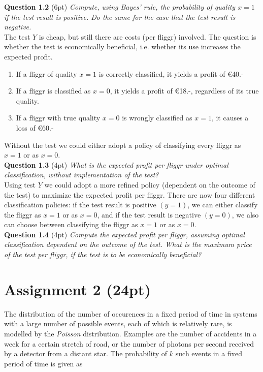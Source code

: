 \documentclass[a4paper]{article}
\begin{document}
\textbf{Question 1.2} (6pt)  \textit{Compute, using Bayes’ rule, the probability of quality $x = 1$ if the test result is positive. Do the same for the case that the test result is negative.}\\


The test $Y$ is cheap, but still there are costs (per fliggr) involved. The question is whether the test is economically beneficial, i.e. whether its use increases the expected profit.

\begin{enumerate}
	\item If a fliggr of quality $x = 1$ is correctly classified, it yields a profit of \euro{}40.-
	\item If a fliggr is classified as $x = 0$, it yields a profit of \euro{}18.-, regardless of its true quality.
	\item If a fliggr with true quality $x = 0$ is wrongly classified as $x = 1$, it causes a loss of \euro{}60.-
\end{enumerate}

Without the test we could either adopt a policy of classifying every fliggr as $x = 1$ or as $x = 0$.\\

\textbf{Question 1.3} (4pt) \textit{What is the expected profit per fliggr under optimal classification, without implementation of the test?}\\


Using test $Y$ we could adopt a more refined policy (dependent on the outcome of the test) to maximize the expected profit per fliggr. There are now four different classification policies: if the test result is positive $(y = 1)$, we can either classify the fliggr as $x = 1$ or as $x = 0$, and if the test result is negative $(y = 0)$, we also can choose between classifying the fliggr as $x = 1$ or as $x = 0$.\\


\textbf{Question 1.4} (4pt) \textit{Compute the expected profit per fliggr, assuming optimal classification dependent on the outcome of the test. What is the maximum price of the test per fliggr, if the test
is to be economically beneficial?}\\

\section*{Assignment 2 (24pt)}

The distribution of the number of occurences in a fixed period of time in systems with a large number of possible events, each of which is relatively rare, is modelled by the \textit{Poisson} distribution.
Examples are the number of accidents in a week for a certain stretch of road, or the number of
photons per second received by a detector from a distant star. The probability of $k$ such events in a fixed period of time is given as
\end{document}
